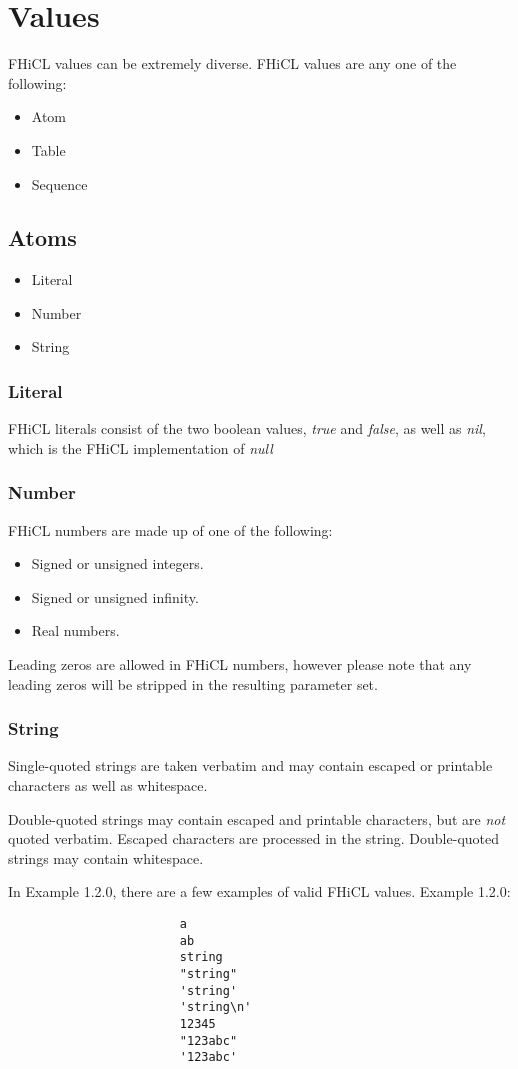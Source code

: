 \documentclass{memarticle}
\begin{document}
\chapter{Values}
	FHiCL values can be extremely diverse.
	FHiCL values are any one of the following:
	\begin{itemize}
		\item Atom
		\item Table
		\item Sequence
	\end{itemize}
	\section{Atoms}
		\begin{itemize}
			\item Literal
			\item Number
			\item String
		\end{itemize}
		\subsection{Literal}
			FHiCL literals consist of the two boolean values,
			\emph{true} and \emph{false},
			as well as \emph{nil},
			which is the FHiCL implementation of \emph{null}
		\subsection{Number}
			FHiCL numbers are made up of one of the following:
			\begin{itemize}
				\item Signed or unsigned integers.
				\item Signed or unsigned infinity.
				\item Real numbers.
			\end{itemize}
			\par
			Leading zeros are allowed in FHiCL numbers, 
			however please note that any leading zeros will be stripped in the resulting parameter set.
		\subsection{String}
	        	\par
        		Single-quoted strings are taken verbatim
        		and may contain escaped or printable characters as well as whitespace.
        		\par
        		Double-quoted strings may contain escaped and printable characters,
        		but are \emph{not} quoted verbatim.
        		Escaped characters are processed in the string.
        		Double-quoted strings may contain whitespace.
       			\par
        		In Example 1.2.0, there are a few examples of valid FHiCL values.
        		Example 1.2.0:
        		\begin{verbatim}
                		a
                		ab
                		string
                		"string"
                		'string'
                		'string\n'
                		12345
                		"123abc"
                		'123abc'
        		\end{verbatim}
\end{document}
